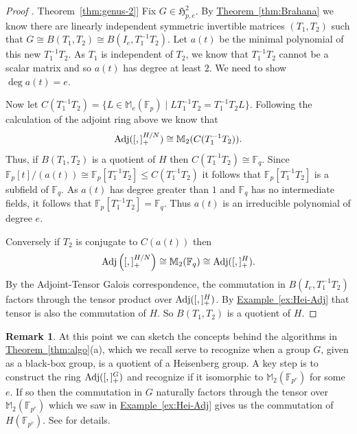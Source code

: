 \documentclass[11pt]{article}
\numberwithin{equation}{section}
\theoremstyle{definition}
\newtheorem{remark}[theorem]{Remark}
\theoremstyle{plain}
\newcommand{\expref}[2]{\hyperref[#2]{#1~\ref{#2}}}
\numberwithin{equation}{section}
\theoremstyle{plain}       %
\theoremstyle{remark}
\theoremstyle{definition}
\numberwithin{figure}{section}
\numberwithin{table}{section}
\newcommand{\mygroups}{\mathfrak{H}}
\newcommand{\bbF}{\mathbb{F}}  %
\begin{document}
\begin{proof}[Proof \expref{Theorem}{thm:genus-2}]
	Fix $G\in \mygroups_{p,e}^2$.  By \expref{Theorem}{thm:Brahana} we know there
	are linearly independent symmetric invertible matrices $(T_1,T_2)$ such that
	$G\cong B(T_1,T_2)\cong B(I_e,T_1^{-1}T_2)$.  Let $a(t)$ be the minimal
	polynomial of this new $T_1^{-1}T_2$.  As $T_1$ is independent of $T_2$, we
	know that $T_1^{-1}T_2$ cannot be a scalar matrix and so $a(t)$ has degree
	at least $2$.  We need to show $\deg a(t)=e$.

Now let $C(T_1^{-1}T_2)=\{L \in\mathbb{M}_e(\bbF_p) \mid
LT_1^{-1}T_2=T_1^{-1}T_2L\}$.  Following the calculation of the adjoint ring
above we know that
\[
  {\rm Adj}([,]_+^{H/N})\cong \mathbb{M}_2(C(T_1^{-1}T_2)).
\]
Thus, if $B(T_1,T_2)$ is a quotient of $H$ then $C(T_1^{-1}T_2)\cong \bbF_q$.
Since $\bbF_p[t]/(a(t))\cong \bbF_p[T_1^{-1}T_2]\leq C(T_1^{-1}T_2)$ it follows
that $\bbF_p[T_1^{-1}T_2]$ is a subfield of $\bbF_q$.  As $a(t)$ has degree
greater than $1$ and $\bbF_q$ has no intermediate fields, it follows that
$\bbF_p[T_1^{-1}T_2]=\bbF_q$.  Thus $a(t)$ is an irreducible polynomial of
degree $e$.

Conversely if $T_2$ is conjugate to $C(a(t))$ then
\[
  {\rm
Adj}\left([,]_+^{H/N}\right)\cong \mathbb{M}_2(\bbF_q)\cong {\rm
Adj}([,]_+^{H}).
\]
By the Adjoint-Tensor Galois correspondence, the commutation
in $B(I_e,T_1^{-1}T_2)$ factors through the tensor product over ${\rm
Adj}([,]_+^H)$.  By \expref{Example}{ex:Hei-Adj} that tensor is also the commutation
of $H$.  So $B(T_1,T_2)$ is a quotient of $H$.
\end{proof}


\begin{remark}
  At this point we can sketch the concepts behind the algorithms in
  \expref{Theorem}{thm:algo}(a), which we recall serve to recognize
  when a group $G$, given as a black-box group, is a quotient of a
  Heisenberg group.  A key step is to construct the ring
  ${\rm Adj}([,]_+^G)$ and recognize if it isomorphic to
  $\mathbb{M}_2(\bbF_{p^e})$ for some $e$.  If so then the commutation
  in $G$ naturally factors through the tensor over
  $\mathbb{M}_2(\bbF_{p^e})$ which we saw in
  \expref{Example}{ex:Hei-Adj} gives us the commutation of
  $H(\bbF_{p^e})$.  See \cite{BMW, LW} for details.
\end{remark}
\end{document}
